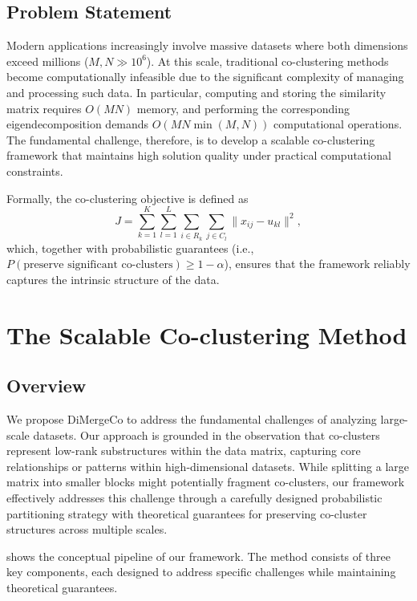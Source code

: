 \documentclass[journal]{IEEEtran}
\begin{document}
\subsection{Problem Statement}
\label{subsec:problem_statement}
Modern applications increasingly involve massive datasets where both dimensions exceed millions ($M, N \gg 10^6$). At this scale, traditional co-clustering methods become computationally infeasible due to the significant complexity of managing and processing such data. In particular, computing and storing the similarity matrix requires $O(MN)$ memory, and performing the corresponding eigendecomposition demands $O(MN\min(M,N))$ computational operations. The fundamental challenge, therefore, is to develop a scalable co-clustering framework that maintains high solution quality under practical computational constraints.

Formally, the co-clustering objective is defined as
\begin{equation}
    J = \sum_{k=1}^{K} \sum_{l=1}^{L} \sum_{i \in R_k} \sum_{j \in C_l} \| x_{ij} - u_{kl} \|^2,
\end{equation}
which, together with probabilistic guarantees (i.e., \(P(\text{preserve significant co-clusters}) \geq 1 - \alpha\)), ensures that the framework reliably captures the intrinsic structure of the data.

\section{The Scalable Co-clustering Method}
\label{sec:proposed_model}

\subsection{Overview}
\label{subsec:overview}
We propose DiMergeCo to address the fundamental challenges of analyzing large-scale datasets. Our approach is grounded in the observation that co-clusters represent low-rank substructures within the data matrix, capturing core relationships or patterns within high-dimensional datasets. While splitting a large matrix into smaller blocks might potentially fragment co-clusters, our framework effectively addresses this challenge through a carefully designed probabilistic partitioning strategy with theoretical guarantees for preserving co-cluster structures across multiple scales.

 shows the conceptual pipeline of our framework. The method consists of three key components, each designed to address specific challenges while maintaining theoretical guarantees.
\end{document}
